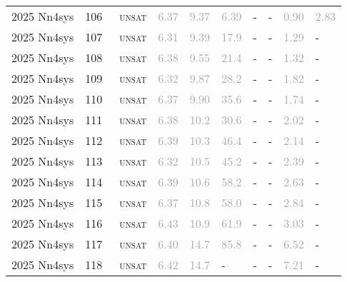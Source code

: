 \begin{center}
{\begin{longtable}{@{}llllllllll@{}}
2025 Nn4sys & 106 & ~\textsc{unsat} & \textcolor{darkgray}{6.37} & \textcolor{darkgray}{9.37} & \textcolor{darkgray}{6.39} & - & - & \textcolor{darkgray}{0.90} & \textcolor{darkgray}{2.83} \\
2025 Nn4sys & 107 & ~\textsc{unsat} & \textcolor{darkgray}{6.31} & \textcolor{darkgray}{9.39} & \textcolor{darkgray}{17.9} & - & - & \textcolor{darkgray}{1.29} & - \\
2025 Nn4sys & 108 & ~\textsc{unsat} & \textcolor{darkgray}{6.38} & \textcolor{darkgray}{9.55} & \textcolor{darkgray}{21.4} & - & - & \textcolor{darkgray}{1.32} & - \\
2025 Nn4sys & 109 & ~\textsc{unsat} & \textcolor{darkgray}{6.32} & \textcolor{darkgray}{9.87} & \textcolor{darkgray}{28.2} & - & - & \textcolor{darkgray}{1.82} & - \\
2025 Nn4sys & 110 & ~\textsc{unsat} & \textcolor{darkgray}{6.37} & \textcolor{darkgray}{9.90} & \textcolor{darkgray}{35.6} & - & - & \textcolor{darkgray}{1.74} & - \\
2025 Nn4sys & 111 & ~\textsc{unsat} & \textcolor{darkgray}{6.38} & \textcolor{darkgray}{10.2} & \textcolor{darkgray}{30.6} & - & - & \textcolor{darkgray}{2.02} & - \\
2025 Nn4sys & 112 & ~\textsc{unsat} & \textcolor{darkgray}{6.39} & \textcolor{darkgray}{10.3} & \textcolor{darkgray}{46.4} & - & - & \textcolor{darkgray}{2.14} & - \\
2025 Nn4sys & 113 & ~\textsc{unsat} & \textcolor{darkgray}{6.32} & \textcolor{darkgray}{10.5} & \textcolor{darkgray}{45.2} & - & - & \textcolor{darkgray}{2.39} & - \\
2025 Nn4sys & 114 & ~\textsc{unsat} & \textcolor{darkgray}{6.39} & \textcolor{darkgray}{10.6} & \textcolor{darkgray}{58.2} & - & - & \textcolor{darkgray}{2.63} & - \\
2025 Nn4sys & 115 & ~\textsc{unsat} & \textcolor{darkgray}{6.37} & \textcolor{darkgray}{10.8} & \textcolor{darkgray}{58.0} & - & - & \textcolor{darkgray}{2.84} & - \\
2025 Nn4sys & 116 & ~\textsc{unsat} & \textcolor{darkgray}{6.43} & \textcolor{darkgray}{10.9} & \textcolor{darkgray}{61.9} & - & - & \textcolor{darkgray}{3.03} & - \\
2025 Nn4sys & 117 & ~\textsc{unsat} & \textcolor{darkgray}{6.40} & \textcolor{darkgray}{14.7} & \textcolor{darkgray}{85.8} & - & - & \textcolor{darkgray}{6.52} & - \\
2025 Nn4sys & 118 & ~\textsc{unsat} & \textcolor{darkgray}{6.42} & \textcolor{darkgray}{14.7} & - & - & - & \textcolor{darkgray}{7.21} & - \\

\end{longtable}}
\end{center}
